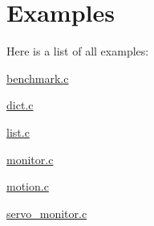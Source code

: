 \section{Examples}
Here is a list of all examples\+:\begin{DoxyCompactItemize}
\item 
\hyperlink{benchmark_8c-example}{benchmark.\+c}
\item 
\hyperlink{dict_8c-example}{dict.\+c}
\item 
\hyperlink{list_8c-example}{list.\+c}
\item 
\hyperlink{monitor_8c-example}{monitor.\+c}
\item 
\hyperlink{motion_8c-example}{motion.\+c}
\item 
\hyperlink{servo_monitor_8c-example}{servo\+\_\+monitor.\+c}
\end{DoxyCompactItemize}
